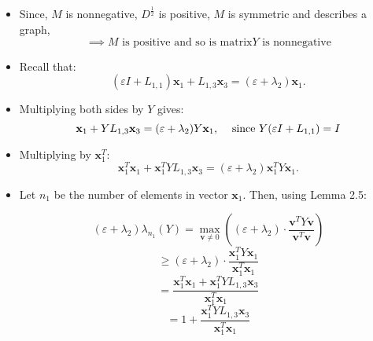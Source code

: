 \documentclass[aspectratio=169]{beamer}
\begin{document}
\begin{frame}

\begin{itemize}
    \item Since,  \( M \) is nonnegative, \( D^{\frac{1}{2}} \) is positive, \( M \) is symmetric and describes a graph,
      \[ \implies M  \text{ is positive and so is matrix} Y \text{ is nonnegative} \]
    \item Recall that:
\[
(\varepsilon I + L_{1,1})\mathbf{x}_1 + L_{1,3}\mathbf{x}_3 = (\varepsilon + \lambda_2)\mathbf{x}_1.
\]



\item Multiplying both sides by \( Y \) gives:
\[
\mathbf{x}_1 + YL_{1,3}\mathbf{x}_3 = (\varepsilon + \lambda_2)Y\mathbf{x}_1,   \hspace{3mm}   \text{ since }  Y(\varepsilon I + L_{1,1}) = I \]


\item Multiplying by \( \mathbf{x}_1^T \):
\[
\mathbf{x}_1^T \mathbf{x}_1 + \mathbf{x}_1^T Y L_{1,3} \mathbf{x}_3 = (\varepsilon + \lambda_2) \mathbf{x}_1^T Y \mathbf{x}_1.
\]

\end{itemize}
\end{frame}


\begin{frame}
    
\begin{itemize}



\item Let \( n_1 \) be the number of elements in vector \( \mathbf{x}_1 \). Then, using Lemma 2.5:

\[
(\varepsilon + \lambda_2)\lambda_{n_1}(Y) = \max_{\mathbf{v} \neq 0} \left( (\varepsilon + \lambda_2) \cdot \frac{\mathbf{v}^T Y \mathbf{v}}{\mathbf{v}^T \mathbf{v}} \right)
\]
\[
\geq (\varepsilon + \lambda_2) \cdot \frac{\mathbf{x}_1^T Y \mathbf{x}_1}{\mathbf{x}_1^T \mathbf{x}_1}
\]
\[
= \frac{\mathbf{x}_1^T \mathbf{x}_1 + \mathbf{x}_1^T Y L_{1,3} \mathbf{x}_3}{\mathbf{x}_1^T \mathbf{x}_1}
\]
\[
= 1 + \frac{\mathbf{x}_1^T Y L_{1,3} \mathbf{x}_3}{\mathbf{x}_1^T \mathbf{x}_1}
\]
\end{itemize}
\end{frame}
\end{document}

